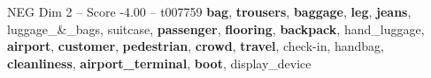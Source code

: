 \begin{textsample}{NEG Dim 2 – Score -4.00 – t007759}  \label{ex:f2_neg_017}
\textbf{bag}, \textbf{trousers}, \textbf{baggage}, \textbf{leg}, \textbf{jeans}, luggage\_\&\_bags, suitcase, \textbf{passenger}, \textbf{flooring}, \textbf{backpack}, hand\_luggage, \textbf{airport}, \textbf{customer}, \textbf{pedestrian}, \textbf{crowd}, \textbf{travel}, check-in, handbag, \textbf{cleanliness}, \textbf{airport\_terminal}, \textbf{boot}, display\_device

\end{textsample}
